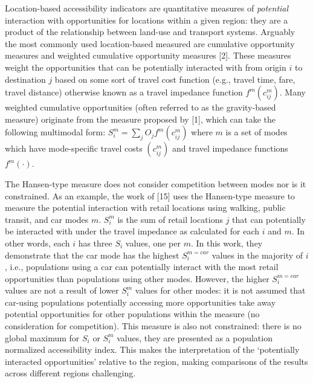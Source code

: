 \documentclass[10pt,letterpaper]{article}
\begin{document}
Location-based accessibility indicators are quantitative measures of
\emph{potential} interaction with opportunities for locations within a
given region: they are a product of the relationship between land-use
and transport systems. Arguably the most commonly used location-based
measured are cumulative opportunity measures and weighted cumulative
opportunity measures {[}2{]}. These measures weight the opportunities
that can be potentially interacted with from origin \(i\) to destination
\(j\) based on some sort of travel cost function (e.g., travel time,
fare, travel distance) otherwise known as a travel impedance function
\(f^{m}(c^m_{ij})\). Many weighted cumulative opportunities (often
referred to as the gravity-based measure) originate from the measure
proposed by {[}1{]}, which can take the following multimodal form:
\(S_i^m = \sum_j O_j f^m(c_{ij}^m)\) where \(m\) is a set of modes which
have mode-specific travel costs \((c_{ij}^m)\) and travel impedance
functions \(f^m(\cdot)\).

The Hansen-type measure does not consider competition between modes nor
is it constrained. As an example, the work of {[}15{]} uses the
Hansen-type measure to measure the potential interaction with retail
locations using walking, public transit, and car modes \(m\). \(S_i^m\)
is the sum of retail locations \(j\) that can potentially be interacted
with under the travel impedance as calculated for each \(i\) and \(m\).
In other words, each \(i\) has three \(S_i\) values, one per \(m\). In
this work, they demonstrate that the car mode has the highest
\(S_i^{m=car}\) values in the majority of \(i\), i.e., populations using
a car can potentially interact with the most retail opportunities than
populations using other modes. However, the higher \(S_i^{m=car}\)
values are not a result of lower \(S_i^{m}\) values for other modes: it
is not assumed that car-using populations potentially accessing more
opportunities take away potential opportunities for other populations
within the measure (no consideration for competition). This measure is
also not constrained: there is no global maximum for \(S_i\) or
\(S_i^m\) values, they are presented as a population normalized
accessibility index. This makes the interpretation of the `potentially
interacted opportunities' relative to the region, making comparisons of
the results across different regions challenging.
\end{document}
